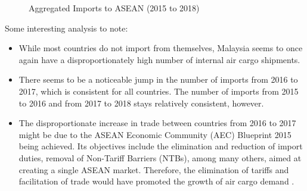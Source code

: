 \documentclass{article}
\begin{document}
\begin{subfigures}
\begin{figure}[H]
    \qquad
    \qquad
    \caption{Aggregated Imports to ASEAN (2015 to 2018)}
\end{figure}
\end{subfigures}

\newpage

\noindent Some interesting analysis to note: \\

\begin{itemize}
    \item While most countries do not import from themselves, Malaysia seems to once again have a disproportionately high number of internal air cargo shipments. 
    \item There seems to be a noticeable jump in the number of imports from 2016 to 2017, which is consistent for all countries. The number of imports from 2015 to 2016 and from 2017 to 2018 stays relatively consistent, however.
    \item The disproportionate increase in trade between countries from 2016 to 2017 might be due to the ASEAN Economic Community (AEC) Blueprint 2015 being achieved. Its objectives include the elimination and reduction of import duties, removal of Non-Tariff Barriers (NTBs), among many others, aimed at creating a single ASEAN market. Therefore, the elimination of tariffs and facilitation of trade would have promoted the growth of air cargo demand \cite{asean2}.
\end{itemize}
\end{document}

